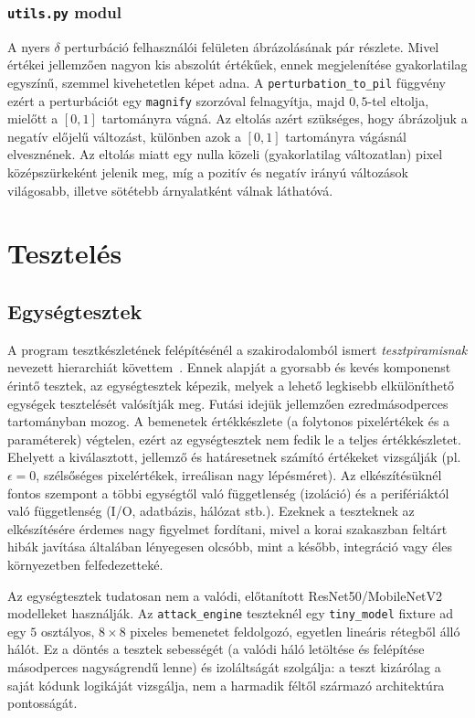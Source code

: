 \subsection{\texttt{utils.py} modul}
A nyers $\delta$ perturbáció felhasználói felületen ábrázolásának pár részlete. 
Mivel értékei jellemzően nagyon kis abszolút értékűek, ennek megjelenítése gyakorlatilag egyszínű, szemmel kivehetetlen képet 
adna. 
A \texttt{perturbation\_to\_pil} függvény ezért a perturbációt egy \texttt{magnify} szorzóval felnagyítja, majd $0{,}5$-tel 
eltolja, mielőtt a $[0, 1]$ tartományra vágná. 
Az eltolás azért szükséges, hogy ábrázoljuk a negatív előjelű változást, különben azok a $[0, 1]$ tartományra vágásnál 
elvesznének. 
Az eltolás miatt egy nulla közeli (gyakorlatilag változatlan) pixel középszürkeként jelenik meg, míg a pozitív és negatív irányú 
változások világosabb, illetve sötétebb árnyalatként válnak láthatóvá. 

\chapter{Tesztelés}

\section{Egységtesztek}
A program tesztkészletének felépítésénél a szakirodalomból ismert \textit{tesztpiramisnak} nevezett hierarchiát 
követtem~\cite{fowler2012testpyramid}. 
Ennek alapját a gyorsabb és kevés komponenst érintő tesztek, az egységtesztek képezik, melyek a lehető legkisebb elkülöníthető 
egységek tesztelését valósítják meg. 
Futási idejük jellemzően ezredmásodperces tartományban mozog. 
A bemenetek értékkészlete (a folytonos pixelértékek és a paraméterek) végtelen, ezért az egységtesztek nem fedik le a teljes értékkészletet. 
Ehelyett a kiválasztott, jellemző és határesetnek számító értékeket vizsgálják (pl. $\epsilon = 0$, szélsőséges pixelértékek, irreálisan nagy lépésméret). 
Az elkészítésüknél fontos szempont a többi egységtől való függetlenség (izoláció) és a perifériáktól való függetlenség (I/O, 
adatbázis, hálózat stb.). 
Ezeknek a teszteknek az elkészítésére érdemes nagy figyelmet fordítani, mivel a korai szakaszban feltárt hibák javítása 
általában lényegesen olcsóbb, mint a később, integráció vagy éles környezetben felfedezetteké. 

Az egységtesztek tudatosan nem a valódi, előtanított ResNet50/MobileNetV2 modelleket használják. 
Az \texttt{attack\_engine} teszteknél egy \texttt{tiny\_model} fixture ad egy $5$ osztályos, $8\times8$ pixeles bemenetet 
feldolgozó, egyetlen lineáris rétegből álló hálót. 
Ez a döntés a tesztek sebességét (a valódi háló letöltése és felépítése másodperces nagyságrendű lenne) és izoláltságát 
szolgálja: a teszt kizárólag a saját kódunk logikáját vizsgálja, nem a harmadik féltől származó architektúra pontosságát. 

